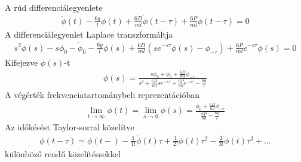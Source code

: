 \pagebreak
A rúd differenciálegyenlete
\begin{align}
    \ddot\phi\left(t\right) - \frac{6g}{l}\phi\left(t\right) + 
    \frac{6D}{ml}\dot\phi\left(t-\tau\right) + \frac{6P}{ml}\phi\left(t-\tau\right) = 0
\end{align}
A differenciálegyenlet Laplace transzformáltja
\begin{align}
    s^2\phi\left(s\right) - s\phi_0 - \dot\phi_0 - 
    \frac{6g}{l}\phi\left(s\right) + 
    \frac{6D}{ml}\left(se^{-s\tau}\phi\left(s\right)-\phi_{-\tau}\right) + 
    \frac{6P}{ml}e^{-s\tau}\phi\left(s\right) = 0 
\end{align}
Kifejezve $\phi\left(s\right)$-t
\begin{align}
    \phi\left(s\right) = \frac{s\phi_0+\dot\phi_0+\frac{6D}{ml}\phi_{-\tau}}{s^2+\frac{6D}{ml}se^{-s\tau}+\frac{6P}{ml}e^{-s\tau}-\frac{6g}{l}}
\end{align}
A végérték frekvenciatartománybeli reprezentációban
\begin{align}
    \lim_{t \to \infty}\phi\left(t\right) = 
    \lim_{s \to 0} \phi\left(s\right) = 
    \frac{\dot\phi_0+\frac{6D}{ml}\phi_{-\tau}}{\frac{6P}{ml}-\frac{6g}{l}}
\end{align}
Az időkésést Taylor-sorral közelítve
\begin{align}
    \phi\left(t-\tau\right) = \phi\left(t-\right) - 
    \frac{1}{1!}\dot\phi\left(t\right)\tau + 
    \frac{1}{2!}\ddot\phi\left(t\right)\tau^2 - 
    \frac{1}{3!}\dddot\phi\left(t\right)\tau^3 + \ldots
\end{align}
különböző rendű közelítéssekkel

